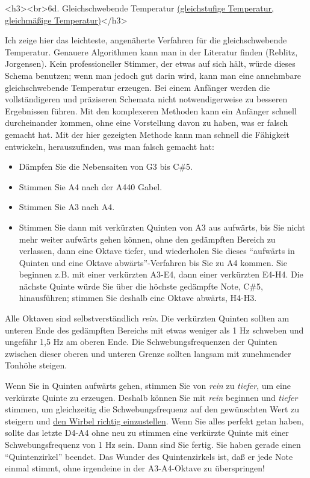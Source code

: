 \label{c2_6d}
\label{c2_6_et}

<h3><br>6d. Gleichschwebende Temperatur \hyperref[et]{(gleichstufige Temperatur, gleichmäßige
 Temperatur)}</h3>

Ich zeige hier das leichteste, angenäherte Verfahren für die gleichschwebende Temperatur.
Genauere Algorithmen kann man in der Literatur finden (Reblitz, Jorgensen).
Kein professioneller Stimmer, der etwas auf sich hält, würde dieses Schema benutzen; wenn man jedoch gut darin wird, kann man eine annehmbare gleichschwebende Temperatur erzeugen.
Bei einem Anfänger werden die vollständigeren und präziseren Schemata nicht notwendigerweise zu besseren Ergebnissen führen.
Mit den komplexeren Methoden kann ein Anfänger schnell durcheinander kommen, ohne eine Vorstellung davon zu haben, was er falsch gemacht hat.
Mit der hier gezeigten Methode kann man schnell die Fähigkeit entwickeln, herauszufinden, was man falsch gemacht hat:

\begin{itemize} 
 \item Dämpfen Sie die Nebensaiten von G3 bis C\#5.
 \item Stimmen Sie A4 nach der A440 Gabel.
 \item Stimmen Sie A3 nach A4.
 \item Stimmen Sie dann mit verkürzten Quinten von A3 aus aufwärts, bis Sie nicht mehr weiter aufwärts gehen können, ohne den gedämpften Bereich zu verlassen, dann eine Oktave tiefer, und wiederholen Sie dieses \enquote{aufwärts in Quinten und eine Oktave abwärts}-Verfahren bis Sie zu A4 kommen.
Sie beginnen z.B. mit einer verkürzten A3-E4, dann einer verkürzten E4-H4.
Die nächste Quinte würde Sie über die höchste gedämpfte Note, C\#5, hinausführen; stimmen Sie deshalb eine Oktave abwärts, H4-H3.
 \end{itemize}

Alle Oktaven sind selbstverständlich \textit{rein}.
Die verkürzten Quinten sollten am unteren Ende des gedämpften Bereichs mit etwas weniger als 1 Hz schweben und ungefähr 1,5 Hz am oberen Ende.
Die Schwebungsfrequenzen der Quinten zwischen dieser oberen und unteren Grenze sollten langsam mit zunehmender Tonhöhe steigen.

Wenn Sie in Quinten aufwärts gehen, stimmen Sie von \textit{rein} zu \textit{tiefer}, um eine verkürzte Quinte zu erzeugen.
Deshalb können Sie mit \textit{rein} beginnen und \textit{tiefer} stimmen, um gleichzeitig die Schwebungsfrequenz auf den gewünschten Wert zu steigern und \hyperref[c2_5_wirb]{den Wirbel richtig einzustellen}.
Wenn Sie alles perfekt getan haben, sollte das letzte D4-A4 ohne neu zu stimmen eine verkürzte Quinte mit einer Schwebungsfrequenz von 1 Hz sein.
Dann sind Sie fertig.
Sie haben gerade einen \enquote{Quintenzirkel} beendet.
Das Wunder des Quintenzirkels ist, daß er jede Note einmal stimmt, ohne irgendeine in der A3-A4-Oktave zu überspringen!

